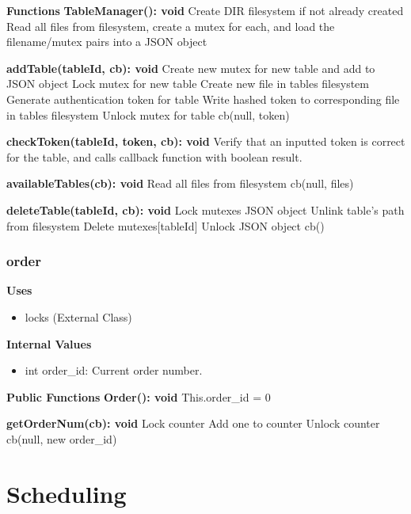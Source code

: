 \documentclass [10pt]{article}
\begin{document}
\textbf{Functions}
\textbf{TableManager(): void}
Create DIR filesystem if not already created
Read all files from filesystem, create a mutex for each, and load the filename/mutex pairs into a JSON object

\textbf{addTable(tableId, cb): void}
Create new mutex for new table and add to JSON object
Lock mutex for new table
Create new file in tables filesystem
Generate authentication token for table
Write hashed token to corresponding file in tables filesystem
Unlock mutex for table
cb(null, token)

\textbf{checkToken(tableId, token, cb): void}
Verify that an inputted token is correct for the table, and calls callback function with boolean result.

\textbf{availableTables(cb): void}
Read all files from filesystem
cb(null, files)

\textbf{deleteTable(tableId, cb): void}
Lock mutexes JSON object
Unlink table’s path from filesystem
Delete mutexes[tableId]
Unlock JSON object
cb()

\subsubsection{order}
\textbf{Uses}
\begin{itemize}
	\item locks (External Class)
\end{itemize}

\textbf{Internal Values}
\begin{itemize}
	\item int order\_id: Current order number.
\end{itemize}

\textbf{Public Functions}
\textbf{Order(): void}
This.order\_id = 0

\textbf{getOrderNum(cb): void}
Lock counter
Add one to counter
Unlock counter
cb(null, new order\_id)


\section {Scheduling}
\end{document}
